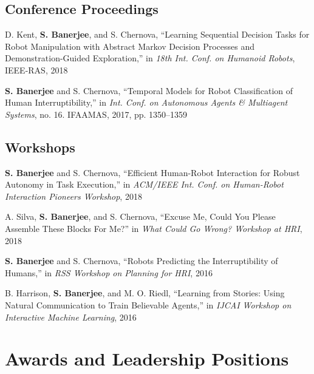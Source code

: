 \documentclass[letterpaper]{article}
\renewenvironment{itemize}{
  \begin{list}{}{
    \setlength{\leftmargin}{1.5em}
  }
}{
  \end{list}
}
\begin{document}
\subsection*{Conference Proceedings}

\begin{itemize}
  \item D. Kent, \textbf{S. Banerjee}, and S. Chernova, ``Learning Sequential Decision Tasks for Robot Manipulation with Abstract Markov Decision Processes and Demonstration-Guided Exploration,'' in \textit{18th Int. Conf. on Humanoid Robots}, IEEE-RAS, 2018

  \item \textbf{S. Banerjee} and S. Chernova, ``Temporal Models for Robot Classification of Human Interruptibility,'' in \textit{Int. Conf. on Autonomous Agents \& Multiagent Systems}, no. 16. IFAAMAS, 2017, pp. 1350--1359
\end{itemize}

\subsection*{Workshops}

\begin{itemize}
  \item \textbf{S. Banerjee} and S. Chernova, ``Efficient Human-Robot Interaction for Robust Autonomy in Task Execution,'' in \textit{ACM/IEEE Int. Conf. on Human-Robot Interaction Pioneers Workshop}, 2018

  \item A. Silva, \textbf{S. Banerjee}, and S. Chernova, ``Excuse Me, Could You Please Assemble These Blocks For Me?'' in \textit{What Could Go Wrong? Workshop at HRI}, 2018

  \item \textbf{S. Banerjee} and S. Chernova, ``Robots Predicting the Interruptibility of Humans,'' in \textit{RSS Workshop on Planning for HRI}, 2016

  \item B. Harrison, \textbf{S. Banerjee}, and M. O. Riedl, ``Learning from Stories: Using Natural Communication to Train Believable Agents,'' in \textit{IJCAI Workshop on Interactive Machine Learning}, 2016
\end{itemize}

\section*{Awards and Leadership Positions}
\end{document}
